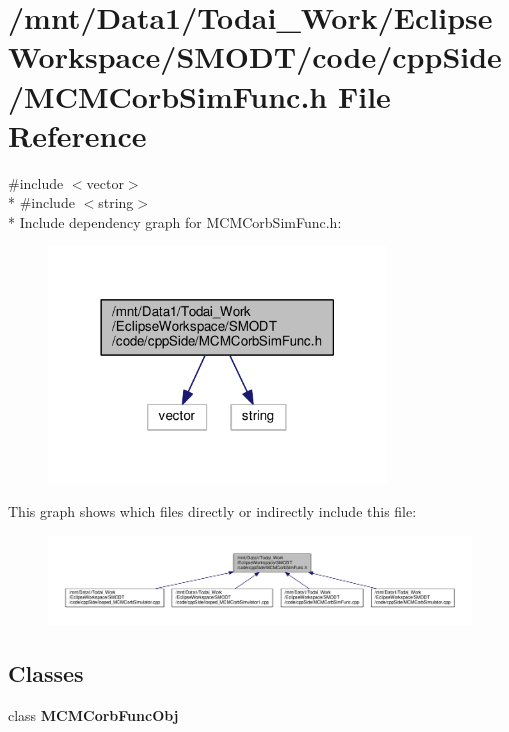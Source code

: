 \section{/mnt/\-Data1/\-Todai\-\_\-\-Work/\-Eclipse\-Workspace/\-S\-M\-O\-D\-T/code/cpp\-Side/\-M\-C\-M\-Corb\-Sim\-Func.h File Reference}
\label{_m_c_m_corb_sim_func_8h}
{\ttfamily \#include $<$vector$>$}\\*
{\ttfamily \#include $<$string$>$}\\*
Include dependency graph for M\-C\-M\-Corb\-Sim\-Func.\-h\-:
\nopagebreak
\begin{figure}[H]
\begin{center}
\leavevmode
\includegraphics[width=254pt]{_m_c_m_corb_sim_func_8h__incl}
\end{center}
\end{figure}
This graph shows which files directly or indirectly include this file\-:
\nopagebreak
\begin{figure}[H]
\begin{center}
\leavevmode
\includegraphics[width=350pt]{_m_c_m_corb_sim_func_8h__dep__incl}
\end{center}
\end{figure}
\subsection*{Classes}
\begin{DoxyCompactItemize}
\item 
class {\bf M\-C\-M\-Corb\-Func\-Obj}
\end{DoxyCompactItemize}
